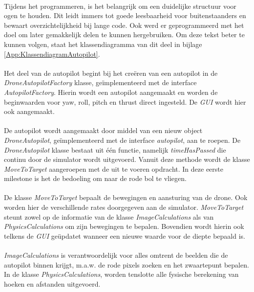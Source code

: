 \\
Tijdens het programmeren, is het belangrijk om een duidelijke structuur voor ogen te houden. Dit leidt immers tot goede leesbaarheid voor buitenstaanders en bewaart overzichtelijkheid bij lange code. Ook werd er geprogrammeerd met het doel om later gemakkelijk delen te kunnen hergebruiken. Om deze tekst beter te kunnen volgen, staat het klassendiagramma van dit deel in bijlage \ref{App:KlassendiagramAutopilot}.
\\
\\
Het deel van de autopilot begint bij het cre\"eren van een autopilot in de \textit{DroneAutopilotFactory} klasse, ge\"implementeerd met de interface \textit{AutopilotFactory}. Hierin wordt een autopilot aangemaakt en worden de beginwaarden voor yaw, roll, pitch en thrust direct ingesteld. De \textit{GUI} wordt hier ook aangemaakt.
\\
\\
De autopilot wordt aangemaakt door middel van een nieuw object \textit{DroneAutopilot}, ge\"implementeerd met de interface \textit{autopilot}, aan te roepen. De \textit{DroneAutopilot} klasse bestaat uit één functie, namelijk \textit{timeHasPassed} die continu door de simulator wordt uitgevoerd. Vanuit deze methode wordt de klasse \textit{MoveToTarget} aangeroepen met de uit te voeren opdracht. In deze eerste milestone is het de bedoeling om naar de rode bol te vliegen.  
\\
\\
De klasse \textit{MoveToTarget} bepaalt de bewegingen en aansturing van de drone. Ook worden hier de verschillende rates doorgegeven aan de simulator. \textit{MoveToTarget} steunt zowel op de informatie van de klasse \textit{ImageCalculations} als van \textit{PhysicsCalculations} om zijn bewegingen te bepalen. Bovendien wordt hierin ook telkens de \textit{GUI} ge\"updatet wanneer een nieuwe waarde voor de diepte bepaald is.
\\
\\
\textit{ImageCalculations} is verantwoordelijk voor alles omtrent de beelden die de autopilot binnen krijgt, m.a.w. de rode pixels zoeken en het zwaartepunt bepalen.
In de klasse \textit{PhysicsCalculations}, worden tenslotte alle fysische berekening van hoeken en afstanden uitgevoerd.